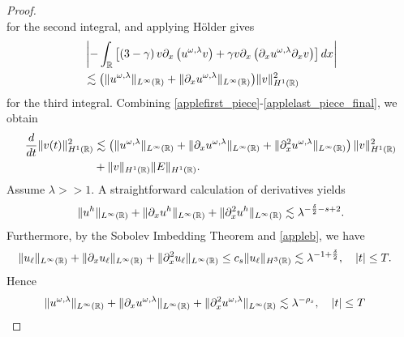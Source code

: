 \begin{proof}
\begin{equation}
\end{equation}
for the second integral, and applying H\"older gives 
\begin{equation}
\begin{split}
\label{applelast_piece_final}
& \left | -\int_{\mathbb{R}} \left[ \left( 3-\gamma \right)v
\partial_x \left( u^{\omega,\lambda} v \right) + \gamma
v \partial_x \left( \partial_x u^{\omega,\lambda} \partial_x v \right)\right]dx \right |
\\
& \lesssim \big(
\|u^{\omega,\lambda}\|_{L^\infty(\mathbb{R})}
+ \|\partial_x u^{\omega,\lambda} \|_{L^\infty(\mathbb{R})} \big)
\|v\|_{H^1(\mathbb{R})}^2
\end{split}
\end{equation}
%
%
%
for the third integral. Combining 
\eqref{applefirst_piece}-\eqref{applelast_piece_final}, we 
obtain
%
%
\begin{equation}
\begin{split}
\label{appleenergy-estimate-best}
\frac{d}{dt} \|v(t)\|_{H^1(\mathbb{R})}^2
& \lesssim \left( \|u^{\omega,\lambda}\|_{L^\infty(\mathbb{R})} + \|
\partial_x u^{\omega,\lambda} \|_{L^\infty(\mathbb{R})} + \|\partial_x^2 u^{\omega,\lambda} 
\|_{L^\infty (\mathbb{R})} \right)
\|v\|_{H^1(\mathbb{R})}^2 \\
&+ \|v\|_{H^1(\mathbb{R})} \|E\|_{H^1(\mathbb{R})}.
\end{split}
\end{equation}
%
%
Assume $\lambda >>1$. A straightforward calculation of derivatives yields
%
%
\begin{equation*}
\begin{split}
\|u^h\|_{L^\infty(\mathbb{R})} + \|\partial_x u^h\|_{L^\infty(\mathbb{R})} + \|\partial_x^2
u^h\|_{L^\infty(\mathbb{R})} \lesssim \lambda^{- \frac{\delta}{2} - s +2 }.
\label{apple53}
\end{split}
\end{equation*}
%
%
Furthermore, by the Sobolev Imbedding Theorem and \cref{appleb}, we have
%
%
%
%
\begin{equation*}
\begin{split}
\|u_\ell\|_{L^\infty(\mathbb{R})} + \|\partial_x u_\ell \|_{L^\infty(\mathbb{R})} + \|\partial_x^2
u_\ell\|_{L^\infty(\mathbb{R})}
& \le c_s \|u_\ell\|_{H^3(\mathbb{R})} 
\lesssim \lambda^{-1 + \frac{\delta}{2}}, 
\quad |t| \le T.
\label{apple55}
\end{split}
\end{equation*}
%
%
Hence
%
%
\begin{equation}
\begin{split}
\|u^{\omega,\lambda}\|_{L^\infty(\rr)} + \|\p_x 
u^{\omega,\lambda}\|_{L^\infty(\rr)} + \|\p_x^2
u^{\omega,\lambda}\|_{L^\infty(\rr)}
& \lesssim \lambda^{-\rho_s}, \quad |t| \le T

\end{split}
\end{equation}
\end{proof}
